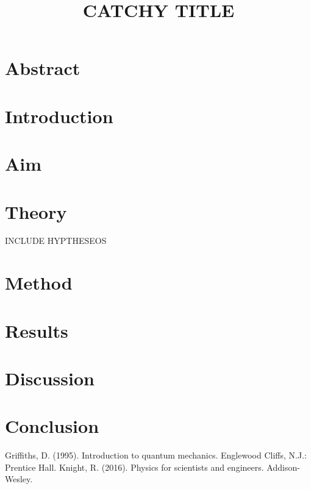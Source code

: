 \title{\vspace{-2cm}CATCHY TITLE}





\maketitle
\section*{Abstract}


\section*{Introduction}


\section*{Aim}



\section*{Theory}
INCLUDE HYPTHESEOS

\section*{Method}




\section*{Results}

\section*{Discussion}


\section*{Conclusion}




\begin{thebibliography}{9}


 Griffiths, D. (1995). Introduction to quantum mechanics. Englewood Cliffs, N.J.: Prentice Hall.
 Knight, R. (2016). Physics for scientists and engineers. Addison-Wesley.

\end{thebibliography}



